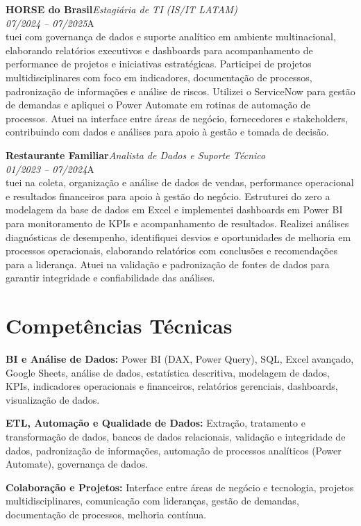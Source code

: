 \documentclass[11pt,a4paper]{article}
\newcommand{\cvrole}[4]{%
  \vspace{4pt}%
  {\bfseries\color{accentcolor}#1}\hfill{\itshape #2}\\[-2pt]%
  {\itshape #3}\hfill #4\\[6pt]%
}
\begin{document}
\cvrole{HORSE do Brasil}{Estagiária de TI (IS/IT LATAM)}{07/2024 -- 07/2025}

Atuei com governança de dados e suporte analítico em ambiente multinacional, elaborando relatórios executivos e dashboards para acompanhamento de performance de projetos e iniciativas estratégicas. Participei de projetos multidisciplinares com foco em indicadores, documentação de processos, padronização de informações e análise de riscos. Utilizei o ServiceNow para gestão de demandas e apliquei o Power Automate em rotinas de automação de processos. Atuei na interface entre áreas de negócio, fornecedores e stakeholders, contribuindo com dados e análises para apoio à gestão e tomada de decisão.

\cvrole{Restaurante Familiar}{Analista de Dados e Suporte Técnico}{01/2023 -- 07/2024}

Atuei na coleta, organização e análise de dados de vendas, performance operacional e resultados financeiros para apoio à gestão do negócio. Estruturei do zero a modelagem da base de dados em Excel e implementei dashboards em Power BI para monitoramento de KPIs e acompanhamento de resultados. Realizei análises diagnósticas de desempenho, identifiquei desvios e oportunidades de melhoria em processos operacionais, elaborando relatórios com conclusões e recomendações para a liderança. Atuei na validação e padronização de fontes de dados para garantir integridade e confiabilidade das análises.

\section{Competências Técnicas}

\textbf{BI e Análise de Dados:} Power BI (DAX, Power Query), SQL, Excel avançado, Google Sheets, análise de dados, estatística descritiva, modelagem de dados, KPIs, indicadores operacionais e financeiros, relatórios gerenciais, dashboards, visualização de dados.

\textbf{ETL, Automação e Qualidade de Dados:} Extração, tratamento e transformação de dados, bancos de dados relacionais, validação e integridade de dados, padronização de informações, automação de processos analíticos (Power Automate), governança de dados.

\textbf{Colaboração e Projetos:} Interface entre áreas de negócio e tecnologia, projetos multidisciplinares, comunicação com lideranças, gestão de demandas, documentação de processos, melhoria contínua.
\end{document}
